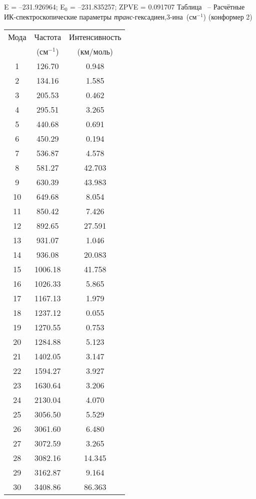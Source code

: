 {E =  --231.926964;    E$_0$ =  --231.835257; ZPVE = 0.091707
\newpage {}
Таблица \thet\, -- Расчётные ИК-спектроскопические параметры {\itshape транс}-гексадиен,3\nobreakdash-ина~(см$^{-1}$) (конформер 2)
 \begin{center}
\begin{tabular}{ccc}
Мода & Частота   & Интенсивность \\
&(см$^{-1}$)&(км/моль)\\
 \hline
    1 &  126.70 &     0.948 \\
     2 &  134.16 &   1.585 \\
     3 &  205.53 &    0.462 \\
     4 &  295.51 &    3.265 \\
     5 &  440.68 &   0.691 \\
     6 &  450.29 &   0.194 \\
     7 &  536.87 &   4.578 \\
     8 &  581.27 &   42.703 \\
     9 &  630.39 &  43.983 \\
    10 &  649.68 &    8.054 \\
    11 &  850.42 &   7.426 \\
    12 &  892.65 &  27.591 \\
    13 &  931.07 &    1.046 \\
    14 &  936.08 &  20.083 \\
    15 & 1006.18 &   41.758 \\
    16 & 1026.33 &    5.865 \\
    17 & 1167.13 &    1.979 \\
    18 & 1237.12 &    0.055 \\
    19 & 1270.55 &    0.753 \\
    20 & 1284.88 &    5.123 \\
    21 & 1402.05 &    3.147 \\
    22 & 1594.27 &    3.927 \\
    23 & 1630.64 &  3.206 \\
    24 & 2130.04 &    4.070 \\
    25 & 3056.50 &    5.529 \\
    26 & 3061.60 &    6.480 \\
    27 & 3072.59 &    3.265 \\
    28 & 3082.16 &   14.345 \\
    29 & 3162.87 &    9.164 \\
    30 & 3408.86 &   86.363 \\
 \end{tabular}
\end{center}
\newpage
}
